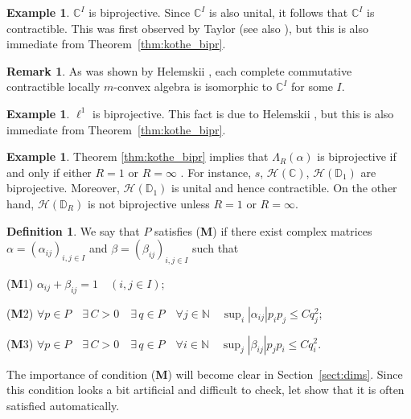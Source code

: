 \documentclass[12pt,reqno]{amsart}
\theoremstyle{definition}
\newtheorem{definition}[theorem]{Definition}
\newtheorem{example}[theorem]{Example}
\newtheorem{remark}[theorem]{Remark}
\begin{document}
\begin{example}
\label{example:CC^I_contr}
${\mathbb C}^I$ is biprojective. Since ${\mathbb C}^I$ is also unital, it follows that
${\mathbb C}^I$ is contractible. This was first observed by Taylor \cite[5.9]{T1}
(see also \cite[IV.5.27]{X1}),
but this is also immediate from Theorem~\ref{thm:kothe_bipr}.
\end{example}

\begin{remark}
As was shown by Helemskii \cite[IV.5.27]{X1}, each complete commutative
contractible locally $m$-convex
algebra is isomorphic to ${\mathbb C}^I$ for some $I$.
\end{remark}

\begin{example}
\label{example:l1_bipr}
$\ell^1$ is biprojective. This fact is due to Helemskii \cite[IV.5.9]{X1},
but this is also immediate from Theorem~\ref{thm:kothe_bipr}.
\end{example}

\begin{example}
\label{example:Lambda_R_bipr}
Theorem \ref{thm:kothe_bipr} implies that $\Lambda_R(\alpha)$ is biprojective
if and only if either $R=1$ or $R=\infty$
\cite[Example 3.5]{Pir_bipr}.
For instance, $s$, ${\mathscr H}({\mathbb C})$, ${\mathscr H}({\mathbb D}_1)$ are biprojective.
Moreover, ${\mathscr H}({\mathbb D}_1)$ is unital and hence contractible.
On the other hand, ${\mathscr H}({\mathbb D}_R)$ is not biprojective unless $R=1$ or $R=\infty$.
\end{example}

\begin{definition}
We say that $P$ satisfies ({\textbf{M}}) if
there exist complex matrices $\alpha=(\alpha_{ij})_{i,j\in I}$
and $\beta=(\beta_{ij})_{i,j\in I}$ such that
\begin{compactenum}
\item[\quad ({\textbf{M}}1)]
$\alpha_{ij}+\beta_{ij}=1\quad (i,j\in I)$;
\item[\quad ({\textbf{M}}2)]
$\forall p\in P\quad\exists\, C>0\quad\exists\, q\in P\quad\forall j\in{\mathbb N}\quad
\sup_i |\alpha_{ij}|p_i p_j\le Cq_j^2$;
\item[\quad ({\textbf{M}}3)]
$\forall p\in P\quad\exists\, C>0\quad\exists\, q\in P\quad\forall i\in{\mathbb N}\quad
\sup_j |\beta_{ij}|p_j p_i\le Cq_i^2$.
\end{compactenum}
\end{definition}

The importance of condition ({\textbf{M}}) will become clear in Section~\ref{sect:dims}.
Since this condition looks a bit artificial and difficult to check, let show that
it is often satisfied automatically.
\end{document}
